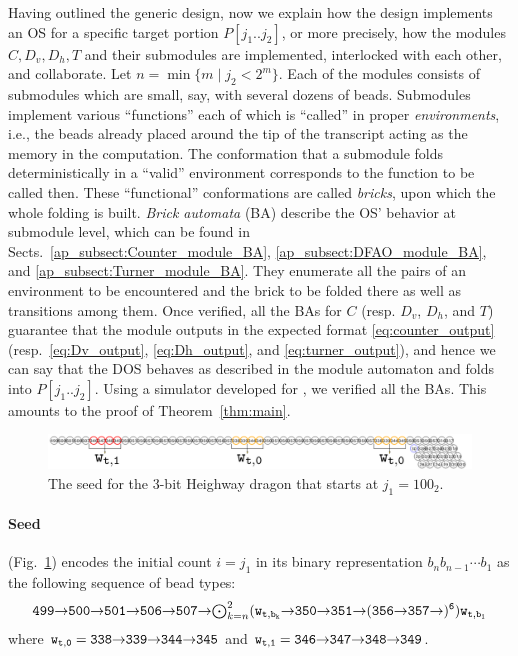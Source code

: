 \documentclass[runningheads]{llncs}
\newcommand{\east}{{\ensuremath \to}}
\newcommand{\se}{{\ensuremath \searrow}}
\begin{document}
Having outlined the generic design, now we explain how the design implements an OS for a specific target portion $P[j_1 .. j_2]$, or more precisely, how the modules $C, D_v, D_h, T$ and their submodules are implemented, interlocked with each other, and collaborate. 
Let $n = \min\{m \mid j_2 < 2^m\}$. 
Each of the modules consists of submodules which are small, say, with several dozens of beads. 
Submodules implement various ``functions'' each of which is ``called'' in proper \textit{environments}, i.e., the beads already placed around the tip of the transcript acting as the memory in the computation. 
The conformation that a submodule folds deterministically in a ``valid'' environment corresponds to the function to be called then. 
These ``functional'' conformations are called \textit{bricks}, upon which the whole folding is built. 
\textit{Brick automata} (BA) describe the OS' behavior at submodule level, which can be found in Sects.~\ref{ap_subsect:Counter_module_BA}, \ref{ap_subsect:DFAO_module_BA}, and \ref{ap_subsect:Turner_module_BA}.
They enumerate all the pairs of an environment to be encountered and the brick to be folded there as well as transitions among them. 
Once verified, all the BAs for $C$ (resp. $D_v$, $D_h$, and $T$) guarantee that the module outputs in the expected format \eqref{eq:counter_output} (resp.~\eqref{eq:Dv_output}, \eqref{eq:Dh_output}, and \eqref{eq:turner_output}), and hence we can say that the DOS behaves as described in the module automaton and folds into $P[j_1 .. j_2]$. 
Using a simulator developed for \cite{HaKiOtSe2016}, we verified all the BAs. 
This amounts to the proof of Theorem~\ref{thm:main}. 


\begin{figure}[tb]
\includegraphics[width=\linewidth]{Figs/seed_sample2.png}
\caption{The seed for the 3-bit Heighway dragon that starts at $j_1 = 100_2$.}
\label{fig:seed}
\end{figure}

\paragraph{Seed} (Fig.~\ref{fig:seed}) encodes the initial count $i = j_1$ in its binary representation $b_n b_{n-1} \cdots b_1$ as the following sequence of bead types: 
\begin{equation}\label{eq:turner_output}
	{\tt 499 \east 500 \east 501 \east 506 \east 507 \east \mbox{$\bigodot_{k = n}^2$} (w_{t, b_k} \east 350 \east 351 \east (356 \east 357 \east)^6) w_{t, b_1}} 
\end{equation}
where ${\tt w_{t, 0} = 338 \east 339 \east 344 \east 345}$ and ${\tt w_{t, 1} = 346 \east 347 \east 348 \east 349}$. 
\end{document}
